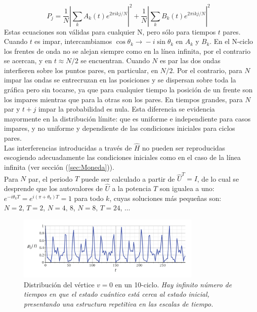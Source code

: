 \begin{equation}
    P_j=\dfrac{1}{N}|\sum_{k}A_k(t)e^{2\pi ikj/N}|^2+\dfrac{1}{N}|\sum_{k}B_k(t)e^{2\pi ikj/N}|^2
\end{equation}
Estas ecuaciones son válidas para cualquier N, pero sólo para tiempos $t$ pares. Cuando $t$ es impar, intercambiamos $\cos\theta_k\xrightarrow{}-i\sin\theta_k$ en $A_k$ y $B_k$. 
En el N-ciclo los frentes de onda no se alejan siempre como en la línea infinita, por el contrario se acercan, y en $t\approx N/2$ se encuentran. Cuando $N$ es par las dos ondas interfieren sobre los puntos pares, en particular, en $N/2$. Por el contrario, para $N$ impar las ondas se entrecruzan en las posiciones y se dispersan sobre toda la gráfica pero sin tocarse, ya que para cualquier tiempo la posición de un frente son los impares mientras que para la otras son los pares. En tiempos grandes, para $N$ par y $t+j$ impar la probabilidad es nula. Esta diferencia se evidencia mayormente en la distribución límite: que es uniforme e independiente para casos impares, y no uniforme y dependiente de las condiciones iniciales para ciclos pares.\\

Las interferencias introducidas a través de $\hat{H}$ no pueden ser reproducidas escogiendo adecuadamente las condiciones iniciales como en el caso de la línea infinita (ver sección (\ref{sec:Moneda})).\\

Para $N$ par, el periodo $T$ puede ser calculado a partir de $\hat{U}^T=I$, de lo cual se desprende que los autovalores de $\hat{U} $ a la potencia $T$ son igualea a uno: $e^{-i\theta_k T}=e^{i(\pi+\theta_k)T}=1$ para todo $k$, cuyas soluciones más pequeñas son: $N=2,\, T=2$, $N=4,\,8$, $N=8,\,T=24$, $\dots$

\begin{figure}[ht]
\centering
\includegraphics[width=0.8\textwidth]{Kap4/Quasiperiodyc10CyclePortugal.png}
\caption{Distribución del vértice $v=0$ en un 10-ciclo. \textit{Hay infinito número de tiempos en que el estado cuántico está cerca al estado inicial, presentando una estructura repetitiva en las escalas de tiempo.} \cite{portugal2013quantum}}
\end{figure}

